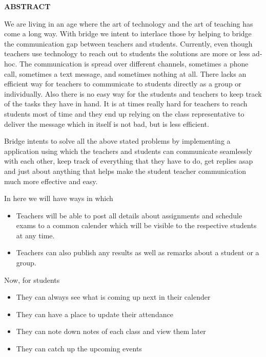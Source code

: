 \vspace{2in}

\centerline{\large{\bfseries{ABSTRACT}}}

\hspace{1in}

\normalsize
We are living in an age where the art of technology and the art of teaching has come a long way. With bridge we intent to interlace those by helping to bridge the communication gap between teachers and students. Currently, even though teachers use technology to reach out to students the solutions are more or less ad-hoc. The communication is spread over different channels, sometimes a phone call, sometimes a text message, and sometimes nothing at all. There lacks an efficient way for teachers to communicate to students directly as a group or individually. Also there is no easy way for the students and teachers to keep track of the tasks they have in hand. It is at times really hard for teachers to reach students most of time and they end up relying on the class representative to deliver the message which in itself is not bad, but is less efficient.

Bridge intents to solve all the above stated problems by implementing a application using which the teachers and students can communicate seamlessly with each other, keep track of everything that they have to do, get replies asap and just about anything that helps make the student teacher communication much more effective and easy.

In here we will have ways in which
\begin{itemize}
\item Teachers will be able to post all details about assignments and schedule exams to a common calender which will be visible to the respective students at any time.
\item Teachers can also publish any results as well as remarks about a student or a group.
\end{itemize}
Now, for students

\begin{itemize}
\item They can always see what is coming up next in their calender
\item They can have a place to update their attendance
\item They can note down notes of each class and view them later
\item They can catch up the upcoming events
\end{itemize}
